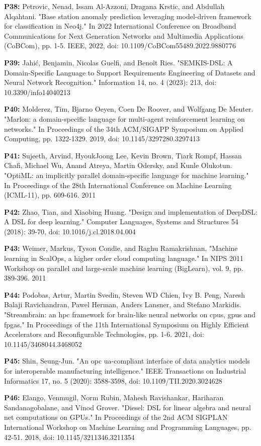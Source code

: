 \begin{footnotesize}
\textbf{P38: } Petrovic, Nenad, Issam Al-Azzoni, Dragana Krstic, and Abdullah Alqahtani. "Base station anomaly prediction leveraging model-driven framework for classification in Neo4j." In 2022 International Conference on Broadband Communications for Next Generation Networks and Multimedia Applications (CoBCom), pp. 1-5. IEEE, 2022, doi: 10.1109/CoBCom55489.2022.9880776

\textbf{P39: } Jahić, Benjamin, Nicolas Guelfi, and Benoît Ries. "SEMKIS-DSL: A Domain-Specific Language to Support Requirements Engineering of Datasets and Neural Network Recognition." Information 14, no. 4 (2023): 213, doi: 10.3390/info14040213

\textbf{P40: } Molderez, Tim, Bjarno Oeyen, Coen De Roover, and Wolfgang De Meuter. "Marlon: a domain-specific language for multi-agent reinforcement learning on networks." In Proceedings of the 34th ACM/SIGAPP Symposium on Applied Computing, pp. 1322-1329. 2019, doi: 10.1145/3297280.3297413

\textbf{P41: } Sujeeth, Arvind, HyoukJoong Lee, Kevin Brown, Tiark Rompf, Hassan Chafi, Michael Wu, Anand Atreya, Martin Odersky, and Kunle Olukotun. "OptiML: an implicitly parallel domain-specific language for machine learning." In Proceedings of the 28th International Conference on Machine Learning (ICML-11), pp. 609-616. 2011

\textbf{P42: } Zhao, Tian, and Xiaobing Huang. "Design and implementation of DeepDSL: A DSL for deep learning." Computer Languages, Systems and Structures 54 (2018): 39-70, doi: 10.1016/j.cl.2018.04.004

\textbf{P43: } Weimer, Markus, Tyson Condie, and Raghu Ramakrishnan. "Machine learning in ScalOps, a higher order cloud computing language." In NIPS 2011 Workshop on parallel and large-scale machine learning (BigLearn), vol. 9, pp. 389-396. 2011

\textbf{P44: } Podobas, Artur, Martin Svedin, Steven WD Chien, Ivy B. Peng, Naresh Balaji Ravichandran, Pawel Herman, Anders Lansner, and Stefano Markidis. "Streambrain: an hpc framework for brain-like neural networks on cpus, gpus and fpgas." In Proceedings of the 11th International Symposium on Highly Efficient Accelerators and Reconfigurable Technologies, pp. 1-6. 2021, doi: 10.1145/3468044.3468052

\textbf{P45: } Shin, Seung-Jun. "An opc ua-compliant interface of data analytics models for interoperable manufacturing intelligence." IEEE Transactions on Industrial Informatics 17, no. 5 (2020): 3588-3598, doi: 10.1109/TII.2020.3024628

\textbf{P46: } Elango, Venmugil, Norm Rubin, Mahesh Ravishankar, Hariharan Sandanagobalane, and Vinod Grover. "Diesel: DSL for linear algebra and neural net computations on GPUs." In Proceedings of the 2nd ACM SIGPLAN International Workshop on Machine Learning and Programming Languages, pp. 42-51. 2018, doi: 10.1145/3211346.3211354

\end{footnotesize}
